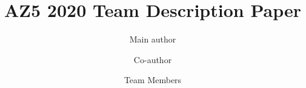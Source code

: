 %

\documentclass[runningheads,a4paper]{llncs}
\usepackage{amssymb}
\setcounter{tocdepth}{3}
\usepackage{graphicx}
\usepackage{amssymb}
\usepackage{enumitem}
\usepackage[utf8]{inputenc}
\usepackage[hidelinks]{hyperref}
\usepackage{url}
\usepackage{float}
\usepackage{amsmath}
\usepackage{graphicx}
\usepackage{wrapfig}
\usepackage{fancyhdr}
\usepackage{titling}
\usepackage{xcolor}
\usepackage{lipsum}



%
\title{AZ5 2020 Team Description Paper}

\author{Main author \and Co-author \and Team Members}



\maketitle

%
\begin{abstract}

\end{abstract}

%
